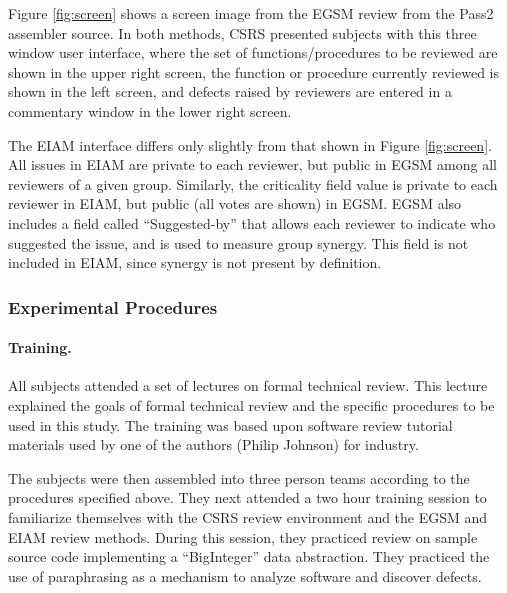 Figure \ref{fig:screen} shows a screen image from the EGSM review from the
Pass2 assembler source.  In both methods, CSRS presented subjects with this
three window user interface, where the set of functions/procedures to be
reviewed are shown in the upper right screen, the function or procedure
currently reviewed is shown in the left screen, and defects raised by
reviewers are entered in a commentary window in the lower right screen.


\begin{figure*}[htb]
{\centerline {}}
 \caption{An EGSM screen image from the ICS-411 round.}
 \label{fig:screen}
\end{figure*}


The EIAM interface differs only slightly from that shown in Figure
\ref{fig:screen}.  All issues in EIAM are private to each reviewer, but
public in EGSM among all reviewers of a given group. Similarly, the
criticality field value is private to each reviewer in EIAM, but public
(all votes are shown) in EGSM. EGSM also includes a field called
``Suggested-by'' that allows each reviewer to indicate who suggested the
issue, and is used to measure group synergy. This field is not included in
EIAM, since synergy is not present by definition.



\subsubsection{Experimental Procedures}

\paragraph{Training.}

All subjects attended a set of lectures on formal technical review. This
lecture explained the goals of formal technical review and the specific
procedures to be used in this study.  The training was based upon software
review tutorial materials used by one of the authors (Philip Johnson) for industry. 

The subjects were then assembled into three person teams according to the
procedures specified above. They next attended a two hour training
session to familiarize themselves with the CSRS review environment and the
EGSM and EIAM review methods. During this session, they practiced review on
sample source code implementing a ``BigInteger'' data abstraction. They
practiced the use of paraphrasing as a mechanism to analyze software and
discover defects.

